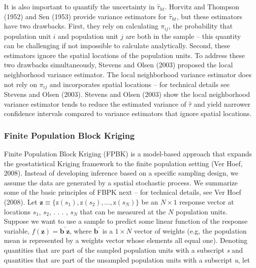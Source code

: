 \documentclass[]{elsarticle} %
\begin{document}
It is also important to quantify the uncertainty in \(\hat{\tau}_{ht}\).
Horvitz and Thompson (1952) and Sen (1953) provide variance estimators
for \(\hat{\tau}_{ht}\), but these estimators have two drawbacks. First,
they rely on calculating \(\pi_{ij}\), the probability that population
unit \(i\) and population unit \(j\) are both in the sample -- this
quantity can be challenging if not impossible to calculate analytically.
Second, these estimators ignore the spatial locations of the population
units. To address these two drawbacks simultaneously, Stevens and Olsen
(2003) proposed the local neighborhood variance estimator. The local
neighborhood variance estimator does not rely on \(\pi_{ij}\) and
incorporates spatial locations -- for technical details see Stevens and
Olsen (2003). Stevens and Olsen (2003) show the local neighborhood
variance estimator tends to reduce the estimated variance of
\(\hat{\tau}\) and yield narrower confidence intervals compared to
variance estimators that ignore spatial locations.

\hypertarget{finite-population-block-kriging}{%
\subsubsection{Finite Population Block
Kriging}\label{finite-population-block-kriging}}

Finite Population Block Kriging (FPBK) is a model-based approach that
expands the geostatistical Kriging framework to the finite population
setting (Ver Hoef, 2008). Instead of developing inference based on a
specific sampling design, we assume the data are generated by a spatial
stochastic process. We summarize some of the basic principles of FBPK
next -- for technical details, see Ver Hoef (2008). Let
\({\mathbf{z} \equiv \{\text{z}(s_1), \text{z}(s_2), . . . , \text{z}(s_N) \}}\)
be an \(N \times 1\) response vector at locations \(s_1\), \(s_2\), . .
. , \(s_N\) that can be measured at the \(N\) population units. Suppose
we want to use a sample to predict some linear function of the response
variable, \(f(\mathbf{z}) = \mathbf{b}^\prime \mathbf{z}\), where
\(\mathbf{b}^\prime\) is a \(1 \times N\) vector of weights (e.g, the
population mean is represented by a weights vector whose elements all
equal one). Denoting quantities that are part of the sampled population
units with a subscript \emph{s} and quantities that are part of the
unsampled population units with a subscript \emph{u}, let
\end{document}
